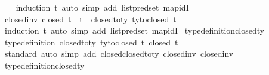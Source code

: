\begin{isabellebody}
%
\isadelimproof
\ \ %
\endisadelimproof
%
\isatagproof
{}\isamarkupfalse%
\ {\isacharparenleft}{\kern0pt}induction\ t{\isacharparenright}{\kern0pt}\ {\isacharparenleft}{\kern0pt}auto\ simp\ add{\isacharcolon}{\kern0pt}\ list{\isachardot}{\kern0pt}pred{\isacharunderscore}{\kern0pt}set\ map{\isacharunderscore}{\kern0pt}idI{\isacharparenright}{\kern0pt}%
\endisatagproof
{\isafoldproof}%
%
\isadelimproof
\isanewline
%
\endisadelimproof
\isanewline
{}\isamarkupfalse%
\ closed{\isacharunderscore}{\kern0pt}inv{}{\isacharunderscore}{\kern0pt}{}{\isacharcolon}{\kern0pt}\ {\isachardoublequoteopen}closed\ t\ {\isasymLongrightarrow}\ t\ {\isacharequal}{\kern0pt}\ closed{\isacharunderscore}{\kern0pt}to{\isacharunderscore}{\kern0pt}ty\ {\isacharparenleft}{\kern0pt}ty{\isacharunderscore}{\kern0pt}to{\isacharunderscore}{\kern0pt}closed\ t{\isacharparenright}{\kern0pt}{\isachardoublequoteclose}\isanewline
%
\isadelimproof
\ \ %
\endisadelimproof
%
\isatagproof
{}\isamarkupfalse%
\ {\isacharparenleft}{\kern0pt}induction\ t{\isacharparenright}{\kern0pt}\ {\isacharparenleft}{\kern0pt}auto\ simp\ add{\isacharcolon}{\kern0pt}\ list{\isachardot}{\kern0pt}pred{\isacharunderscore}{\kern0pt}set\ map{\isacharunderscore}{\kern0pt}idI{\isacharparenright}{\kern0pt}%
\endisatagproof
{\isafoldproof}%
%
\isadelimproof
\isanewline
%
\endisadelimproof
\isanewline
{}\isamarkupfalse%
\ type{\isacharunderscore}{\kern0pt}definition{\isacharunderscore}{\kern0pt}closed{\isacharunderscore}{\kern0pt}ty{\isacharcolon}{\kern0pt}\isanewline
\ {\isachardoublequoteopen}type{\isacharunderscore}{\kern0pt}definition\ closed{\isacharunderscore}{\kern0pt}to{\isacharunderscore}{\kern0pt}ty\ ty{\isacharunderscore}{\kern0pt}to{\isacharunderscore}{\kern0pt}closed\ {\isacharbraceleft}{\kern0pt}t{\isachardot}{\kern0pt}\ closed\ t{\isacharbraceright}{\kern0pt}{\isachardoublequoteclose}\isanewline
%
\isadelimproof
\ \ %
\endisadelimproof
%
\isatagproof
{}\isamarkupfalse%
\ standard\ {\isacharparenleft}{\kern0pt}auto\ simp\ add{\isacharcolon}{\kern0pt}\ closed{\isacharunderscore}{\kern0pt}closed{\isacharunderscore}{\kern0pt}to{\isacharunderscore}{\kern0pt}ty\ closed{\isacharunderscore}{\kern0pt}inv{}\ closed{\isacharunderscore}{\kern0pt}inv{}{\isacharparenright}{\kern0pt}%
\endisatagproof
{\isafoldproof}%
%
\isadelimproof
\isanewline
%
\endisadelimproof
\isanewline
{}\isamarkupfalse%
\ type{\isacharunderscore}{\kern0pt}definition{\isacharunderscore}{\kern0pt}closed{\isacharunderscore}{\kern0pt}ty\isanewline

\end{isabellebody}

